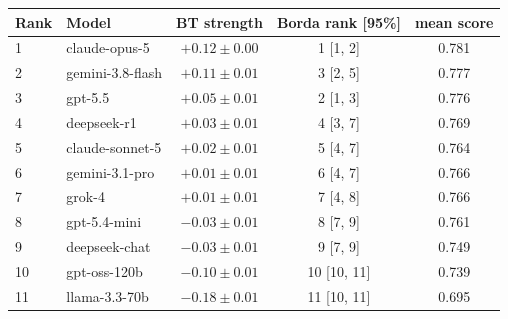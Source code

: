 \begin{tabular}{llccc}
\toprule
Rank & Model & BT strength & Borda rank [95\%] & mean score \\
\midrule
1 & claude-opus-5 & $+0.12 \pm 0.00$ & 1 [1, 2] & 0.781 \\
2 & gemini-3.8-flash & $+0.11 \pm 0.01$ & 3 [2, 5] & 0.777 \\
3 & gpt-5.5 & $+0.05 \pm 0.01$ & 2 [1, 3] & 0.776 \\
4 & deepseek-r1 & $+0.03 \pm 0.01$ & 4 [3, 7] & 0.769 \\
5 & claude-sonnet-5 & $+0.02 \pm 0.01$ & 5 [4, 7] & 0.764 \\
6 & gemini-3.1-pro & $+0.01 \pm 0.01$ & 6 [4, 7] & 0.766 \\
7 & grok-4 & $+0.01 \pm 0.01$ & 7 [4, 8] & 0.766 \\
8 & gpt-5.4-mini & $-0.03 \pm 0.01$ & 8 [7, 9] & 0.761 \\
9 & deepseek-chat & $-0.03 \pm 0.01$ & 9 [7, 9] & 0.749 \\
10 & gpt-oss-120b & $-0.10 \pm 0.01$ & 10 [10, 11] & 0.739 \\
11 & llama-3.3-70b & $-0.18 \pm 0.01$ & 11 [10, 11] & 0.695 \\
\bottomrule
\end{tabular}
